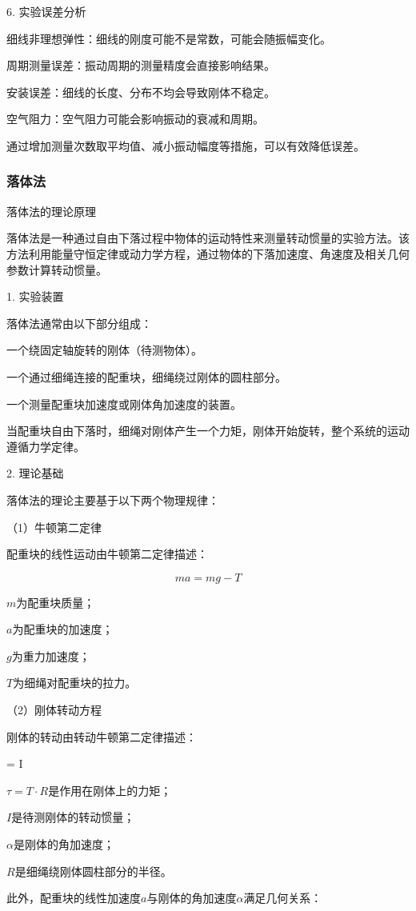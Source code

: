 \documentclass[12pt,hyperref,a4paper,UTF8]{ctexart}
\begin{document}
6. 实验误差分析

细线非理想弹性：细线的刚度可能不是常数，可能会随振幅变化。

周期测量误差：振动周期的测量精度会直接影响结果。

安装误差：细线的长度、分布不均会导致刚体不稳定。

空气阻力：空气阻力可能会影响振动的衰减和周期。


通过增加测量次数取平均值、减小振动幅度等措施，可以有效降低误差。

\subsubsection{落体法}

落体法的理论原理

落体法是一种通过自由下落过程中物体的运动特性来测量转动惯量的实验方法。该方法利用能量守恒定律或动力学方程，通过物体的下落加速度、角速度及相关几何参数计算转动惯量。

1. 实验装置

落体法通常由以下部分组成：

一个绕固定轴旋转的刚体（待测物体）。

一个通过细绳连接的配重块，细绳绕过刚体的圆柱部分。

一个测量配重块加速度或刚体角加速度的装置。


当配重块自由下落时，细绳对刚体产生一个力矩，刚体开始旋转，整个系统的运动遵循力学定律。

2. 理论基础

落体法的理论主要基于以下两个物理规律：

（1）牛顿第二定律

配重块的线性运动由牛顿第二定律描述：

$$ ma = mg - T $$

 $m$为配重块质量；

 $a$为配重块的加速度；

 $g$为重力加速度；

 $T$为细绳对配重块的拉力。


（2）刚体转动方程

刚体的转动由转动牛顿第二定律描述：

\tau = I \alpha

 $\tau=T\cdot R$是作用在刚体上的力矩；

 $I$是待测刚体的转动惯量；

 $\alpha$是刚体的角加速度；

 $R$是细绳绕刚体圆柱部分的半径。


此外，配重块的线性加速度$a$与刚体的角加速度$\alpha$满足几何关系：
\end{document}
